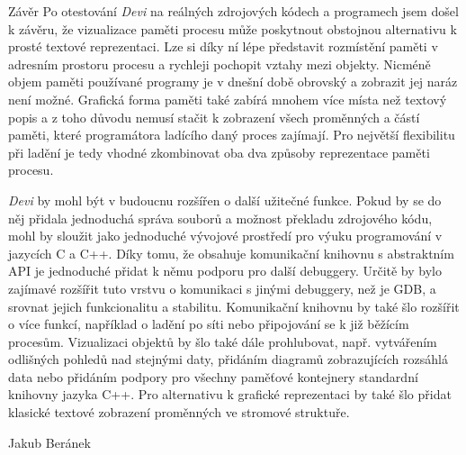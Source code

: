 \documentclass[bc,male,python,dept460]{diploma}						%
\newcommand{\parspace}[1][]{
	\ifthenelse{\isempty{#1}}{\vspace{5mm}}{\vspace{#1}}
	\par
}
\begin{document}
\begin{section}{Závěr}
\label{sec:Conclusion}
Po otestování \textit{Devi} na reálných zdrojových kódech a programech jsem došel k závěru, že vizualizace paměti procesu může poskytnout obstojnou
alternativu k prosté textové reprezentaci. Lze si díky ní lépe představit rozmístění paměti v adresním prostoru procesu a rychleji pochopit vztahy mezi objekty.
Nicméně objem paměti používané programy je v dnešní době obrovský a zobrazit jej naráz není možné. Grafická forma paměti také zabírá mnohem více místa než textový
popis a z toho důvodu nemusí stačit k zobrazení všech proměnných a částí paměti, které programátora ladícího daný proces zajímají. Pro největší flexibilitu
při ladění je tedy vhodné zkombinovat oba dva způsoby reprezentace paměti procesu.

\parspace \textit{Devi} by mohl být v budoucnu rozšířen o další užitečné funkce. Pokud by se do něj přidala jednoduchá správa souborů a možnost překladu
zdrojového kódu, mohl by sloužit jako jednoduché vývojové prostředí pro výuku programování v jazycích C a C++.
Díky tomu, že obsahuje komunikační knihovnu s abstraktním API je jednoduché přidat k němu podporu pro další debuggery. Určitě by bylo
zajímavé rozšířit tuto vrstvu o komunikaci s jinými debuggery, než je GDB, a srovnat jejich funkcionalitu a stabilitu.
Komunikační knihovnu by také šlo rozšířit o více funkcí, například o ladění po síti nebo připojování se k již běžícím procesům.
Vizualizaci objektů by šlo také dále prohlubovat, např. vytvářením odlišných pohledů nad stejnými daty, přidáním diagramů zobrazujících rozsáhlá data nebo
přidáním podpory pro všechny paměťové kontejnery standardní knihovny jazyka C++. Pro alternativu k grafické reprezentaci by také šlo přidat klasické textové
zobrazení proměnných ve stromové struktuře.
\end{section}

\bigskip
\begin{flushright}
Jakub Beránek
\end{flushright}

\printbibliography %
\end{document}
